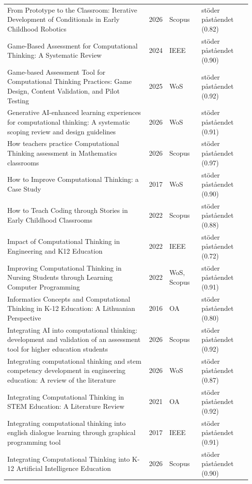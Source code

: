 \begin{longtable}{@{}%
  >{\raggedright\arraybackslash}p{}c%
  >{\raggedright\arraybackslash}p{}%
  >{\raggedright\arraybackslash}p{}@{}}
From Prototype to the Classroom: Iterative Development of Conditionals in Early Childhood Robotics & 2026 & Scopus & stöder påståendet (0.82) \\
Game-Based Assessment for Computational Thinking: A Systematic Review & 2024 & IEEE & stöder påståendet (0.90) \\
Game-based Assessment Tool for Computational Thinking Practices: Game Design, Content Validation, and Pilot Testing & 2025 & WoS & stöder påståendet (0.92) \\
Generative AI-enhanced learning experiences for computational thinking: A systematic scoping review and design guidelines & 2026 & WoS & stöder påståendet (0.91) \\
How teachers practice Computational Thinking assessment in Mathematics classrooms & 2026 & Scopus & stöder påståendet (0.97) \\
How to Improve Computational Thinking: a Case Study & 2017 & WoS & stöder påståendet (0.90) \\
How to Teach Coding through Stories in Early Childhood Classrooms & 2022 & Scopus & stöder påståendet (0.88) \\
Impact of Computational Thinking in Engineering and K12 Education & 2022 & IEEE & stöder påståendet (0.72) \\
Improving Computational Thinking in Nursing Students through Learning Computer Programming & 2022 & WoS, Scopus & stöder påståendet (0.91) \\
Informatics Concepts and Computational Thinking in K-12 Education: A Lithuanian Perspective & 2016 & OA & stöder påståendet (0.80) \\
Integrating AI into computational thinking: development and validation of an assessment tool for higher education students & 2026 & Scopus & stöder påståendet (0.92) \\
Integrating computational thinking and stem competency development in engineering education: A review of the literature & 2026 & WoS & stöder påståendet (0.87) \\
Integrating Computational Thinking in STEM Education: A Literature Review & 2021 & OA & stöder påståendet (0.92) \\
Integrating computational thinking into english dialogue learning through graphical programming tool & 2017 & IEEE & stöder påståendet (0.91) \\
Integrating Computational Thinking into K-12 Artificial Intelligence Education & 2026 & Scopus & stöder påståendet (0.90) \\

\end{longtable}
